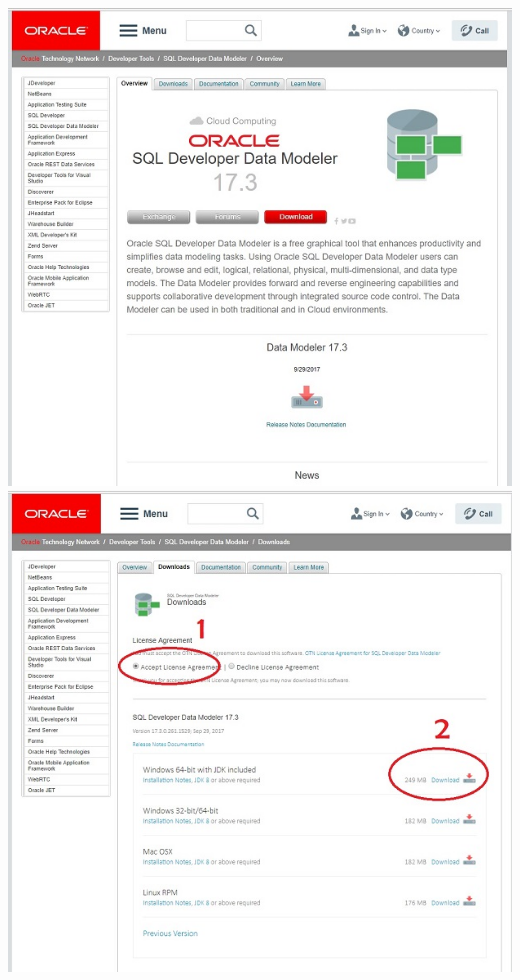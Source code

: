 \documentclass[a4paper,openright,12pt]{book}
\begin{document}
\begin{center}
\includegraphics[scale=1]{Imag04/1.jpg}\\
\includegraphics[scale=1]{Imag04/2.jpg}\\

\end{center}
\end{document}
